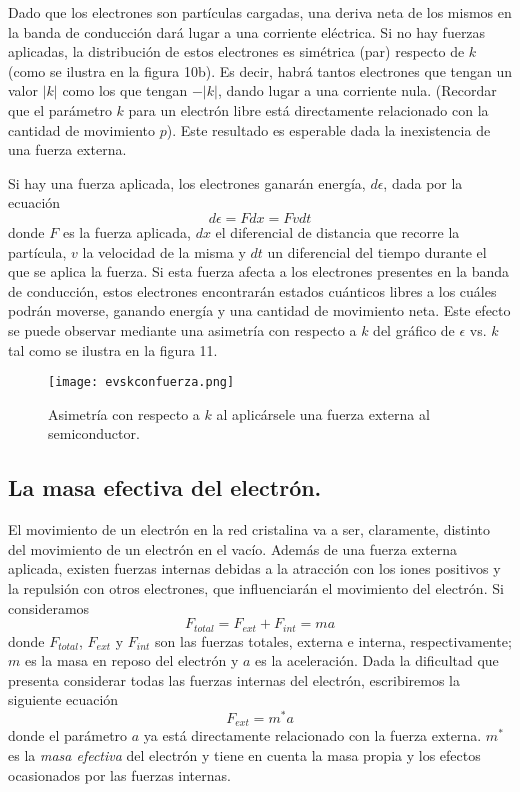 \documentclass[12pt,a4paper]{article}
\begin{document}
Dado que los electrones son partículas cargadas, una deriva neta de los mismos en la banda de conducción dará lugar a una corriente eléctrica. Si no hay fuerzas aplicadas, la distribución de estos electrones es simétrica (par) respecto de $k$ (como se ilustra en la figura 10b). Es decir, habrá tantos electrones que tengan un valor $|k|$ como los que tengan $-|k|$, dando lugar a una corriente nula. (Recordar que el parámetro $k$ para un electrón libre está directamente relacionado con la cantidad de movimiento $p$). Este resultado es esperable dada la inexistencia de una fuerza externa.

Si hay una fuerza aplicada, los electrones ganarán energía, $d\epsilon$, dada por la ecuación
\[ d\epsilon = F dx = F v dt \]
donde $F$ es la fuerza aplicada, $dx$ el diferencial de distancia que recorre la partícula, $v$ la velocidad de la misma y $dt$ un diferencial del tiempo durante el que se aplica la fuerza. Si esta fuerza afecta a los electrones presentes en la banda de conducción, estos electrones encontrarán estados cuánticos libres a los cuáles podrán moverse, ganando energía y una cantidad de movimiento neta. Este efecto se puede observar mediante una asimetría con respecto a $k$ del gráfico de $\epsilon$ vs. $k$ tal como se ilustra en la figura 11.

\begin{figure}[ht!]
\begin{center}
\texttt{[image: evskconfuerza.png]}
\caption{Asimetría con respecto a $k$ al aplicársele una fuerza externa al semiconductor.}
\end{center}
\end{figure}

\subsection{La masa efectiva del electrón.}

El movimiento de un electrón en la red cristalina va a ser, claramente, distinto del movimiento de un electrón en el vacío. Además de una fuerza externa aplicada, existen fuerzas internas debidas a la atracción con los iones positivos y la repulsión con otros electrones, que influenciarán el movimiento del electrón. Si consideramos
\[ F_{total} = F_{ext}+F_{int}=ma \]
donde $F_{total}$, $F_{ext}$ y $F_{int}$ son las fuerzas totales, externa e interna, respectivamente; $m$ es la masa en reposo del electrón y $a$ es la aceleración. Dada la dificultad que presenta considerar todas las fuerzas internas del electrón, escribiremos la siguiente ecuación
\[ F_{ext} = m^{\ast} a \]
donde el parámetro $a$ ya está directamente relacionado con la fuerza externa. $m^{\ast}$ es la \emph{masa efectiva} del electrón y tiene en cuenta la masa propia y los efectos ocasionados por las fuerzas internas.
\end{document}
